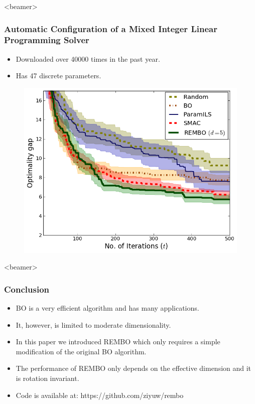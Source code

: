 \documentclass[grey]{beamer}
\begin{document}
 
 \begin{frame}<beamer>
 \frametitle{Automatic Configuration of a Mixed Integer
Linear Programming Solver}
   \begin{itemize}
   \small
   \item Downloaded over 40000 times in the past year.
   \item Has 47 discrete parameters.
  \end{itemize}
  \begin{figure}[h!]
   \begin{center}
     \includegraphics[width=0.7\columnwidth]{../paper/figures/lpsolve.png}     
   \label{fig:lpsolve}
   \end{center}
   \vspace*{-3mm}
  \end{figure}
 \end{frame}
 
 \begin{frame}<beamer>
 \frametitle{Conclusion}
  \begin{itemize}
   \item BO is a very efficient algorithm and has many applications.
   \item It, however, is limited to moderate dimensionality.
   \item In this paper we introduced REMBO which only requires a simple modification of the original BO algorithm.
   \item The performance of REMBO only depends on the effective dimension and it is rotation invariant.
   \item Code is available at: https://github.com/ziyuw/rembo


  \end{itemize}

 \end{frame}
 
\end{document}
